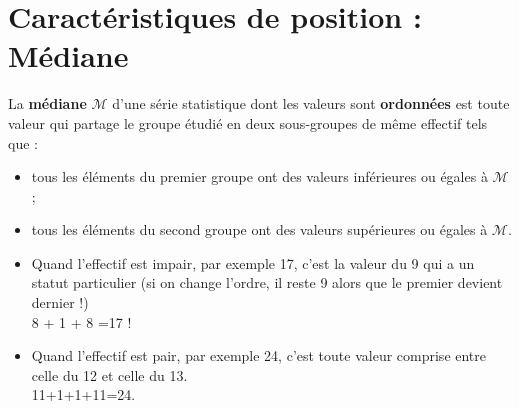 \section{Caractéristiques de position : Médiane}
    \begin{definition}
        La {\bf médiane} $\mathcal{M}$ d'une série statistique dont les valeurs sont \textbf{ordonnées} est toute valeur qui partage le groupe étudié en deux sous-groupes de même effectif tels que :
        \begin{itemize}
            \item tous les éléments du premier groupe ont des valeurs inférieures  ou égales à $\mathcal{M}$ ;
            \item tous les éléments du second groupe ont des valeurs supérieures ou égales à $\mathcal{M}$.
        \end{itemize}
    \end{definition}

    \begin{remarques}
        \begin{itemize}
            \item Quand l'effectif est impair, par exemple 17, c'est la valeur du 9\ieme{} qui a un statut particulier (si on change l'ordre, il reste 9\ieme{} alors que le premier devient dernier !) \\ 
            8 + 1 + 8 =17 !
            \item Quand l'effectif est pair, par exemple 24, c'est toute valeur comprise entre celle du 12\ieme{} et celle du 13\ieme{}.\\
            11+1+1+11=24.
        \end{itemize}
    \end{remarques}

